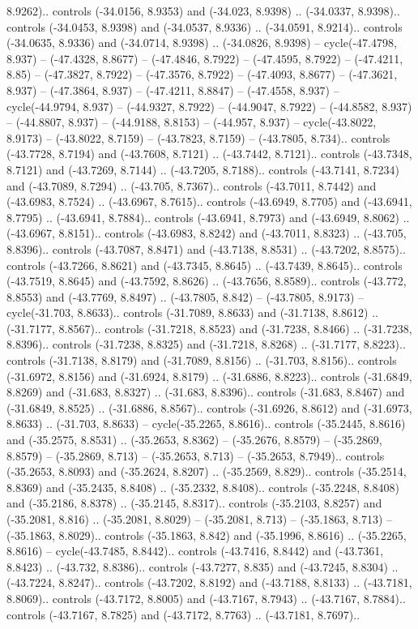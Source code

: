 \begin{scope}[shift={(2.5552, 9.9912)}]
\begin{scope}[shift={(48.1654, -14.8546)}]
8.9262).. controls (-34.0156, 8.9353) and (-34.023, 8.9398) .. (-34.0337, 8.9398).. controls (-34.0453, 8.9398) and (-34.0537, 8.9336) .. (-34.0591, 8.9214).. controls (-34.0635, 8.9336) and (-34.0714, 8.9398) .. (-34.0826, 8.9398) -- cycle(-47.4798, 8.937) -- (-47.4328, 8.8677) -- (-47.4846, 8.7922) -- (-47.4595, 8.7922) -- (-47.4211, 8.85) -- (-47.3827, 8.7922) -- (-47.3576, 8.7922) -- (-47.4093, 8.8677) -- (-47.3621, 8.937) -- (-47.3864, 8.937) -- (-47.4211, 8.8847) -- (-47.4558, 8.937) -- cycle(-44.9794, 8.937) -- (-44.9327, 8.7922) -- (-44.9047, 8.7922) -- (-44.8582, 8.937) -- (-44.8807, 8.937) -- (-44.9188, 8.8153) -- (-44.957, 8.937) -- cycle(-43.8022, 8.9173) -- (-43.8022, 8.7159) -- (-43.7823, 8.7159) -- (-43.7805, 8.734).. controls (-43.7728, 8.7194) and (-43.7608, 8.7121) .. (-43.7442, 8.7121).. controls (-43.7348, 8.7121) and (-43.7269, 8.7144) .. (-43.7205, 8.7188).. controls (-43.7141, 8.7234) and (-43.7089, 8.7294) .. (-43.705, 8.7367).. controls (-43.7011, 8.7442) and (-43.6983, 8.7524) .. (-43.6967, 8.7615).. controls (-43.6949, 8.7705) and (-43.6941, 8.7795) .. (-43.6941, 8.7884).. controls (-43.6941, 8.7973) and (-43.6949, 8.8062) .. (-43.6967, 8.8151).. controls (-43.6983, 8.8242) and (-43.7011, 8.8323) .. (-43.705, 8.8396).. controls (-43.7087, 8.8471) and (-43.7138, 8.8531) .. (-43.7202, 8.8575).. controls (-43.7266, 8.8621) and (-43.7345, 8.8645) .. (-43.7439, 8.8645).. controls (-43.7519, 8.8645) and (-43.7592, 8.8626) .. (-43.7656, 8.8589).. controls (-43.772, 8.8553) and (-43.7769, 8.8497) .. (-43.7805, 8.842) -- (-43.7805, 8.9173) -- cycle(-31.703, 8.8633).. controls (-31.7089, 8.8633) and (-31.7138, 8.8612) .. (-31.7177, 8.8567).. controls (-31.7218, 8.8523) and (-31.7238, 8.8466) .. (-31.7238, 8.8396).. controls (-31.7238, 8.8325) and (-31.7218, 8.8268) .. (-31.7177, 8.8223).. controls (-31.7138, 8.8179) and (-31.7089, 8.8156) .. (-31.703, 8.8156).. controls (-31.6972, 8.8156) and (-31.6924, 8.8179) .. (-31.6886, 8.8223).. controls (-31.6849, 8.8269) and (-31.683, 8.8327) .. (-31.683, 8.8396).. controls (-31.683, 8.8467) and (-31.6849, 8.8525) .. (-31.6886, 8.8567).. controls (-31.6926, 8.8612) and (-31.6973, 8.8633) .. (-31.703, 8.8633) -- cycle(-35.2265, 8.8616).. controls (-35.2445, 8.8616) and (-35.2575, 8.8531) .. (-35.2653, 8.8362) -- (-35.2676, 8.8579) -- (-35.2869, 8.8579) -- (-35.2869, 8.713) -- (-35.2653, 8.713) -- (-35.2653, 8.7949).. controls (-35.2653, 8.8093) and (-35.2624, 8.8207) .. (-35.2569, 8.829).. controls (-35.2514, 8.8369) and (-35.2435, 8.8408) .. (-35.2332, 8.8408).. controls (-35.2248, 8.8408) and (-35.2186, 8.8378) .. (-35.2145, 8.8317).. controls (-35.2103, 8.8257) and (-35.2081, 8.816) .. (-35.2081, 8.8029) -- (-35.2081, 8.713) -- (-35.1863, 8.713) -- (-35.1863, 8.8029).. controls (-35.1863, 8.842) and (-35.1996, 8.8616) .. (-35.2265, 8.8616) -- cycle(-43.7485, 8.8442).. controls (-43.7416, 8.8442) and (-43.7361, 8.8423) .. (-43.732, 8.8386).. controls (-43.7277, 8.835) and (-43.7245, 8.8304) .. (-43.7224, 8.8247).. controls (-43.7202, 8.8192) and (-43.7188, 8.8133) .. (-43.7181, 8.8069).. controls (-43.7172, 8.8005) and (-43.7167, 8.7943) .. (-43.7167, 8.7884).. controls (-43.7167, 8.7825) and (-43.7172, 8.7763) .. (-43.7181, 8.7697).. 
\end{scope}
\end{scope}
